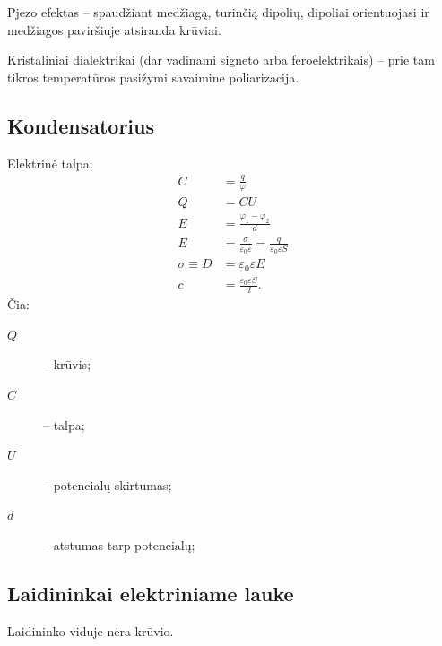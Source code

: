 Pjezo efektas – spaudžiant medžiagą, turinčią dipolių, dipoliai
orientuojasi ir medžiagos paviršiuje atsiranda krūviai.

Kristaliniai dialektrikai (dar vadinami signeto arba feroelektrikais) – 
prie tam tikros temperatūros pasižymi savaimine poliarizacija.

\subsection{Kondensatorius}

Elektrinė talpa:
\begin{align*}
  C &= \frac{q}{\varphi} \\
  Q &= CU \\
  E &= \frac{\varphi_{1} - \varphi_{2}}{d} \\
  E &= \frac{\sigma}{\varepsilon_{0}\varepsilon} = 
  \frac{q}{\varepsilon_{0}\varepsilon S} \\
  \sigma \equiv D &= \varepsilon_{0} \varepsilon E \\
  c &= \frac{\varepsilon_{0} \varepsilon S}{d}.
\end{align*}
Čia:
\begin{description}
  \item[$Q$] – krūvis;
  \item[$C$] – talpa;
  \item[$U$] – potencialų skirtumas;
  \item[$d$] – atstumas tarp potencialų;
\end{description}

\subsection{Laidininkai elektriniame lauke}

Laidininko viduje nėra krūvio.
